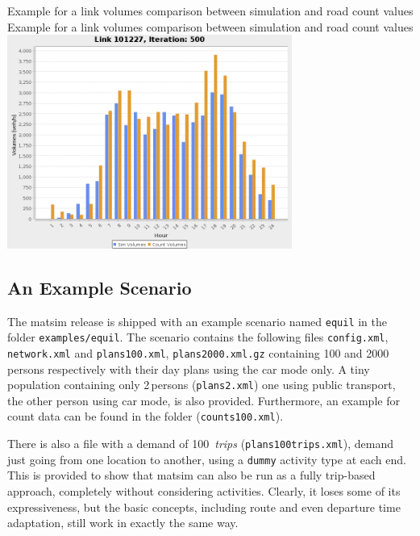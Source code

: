 \createfigure%
{Example for a link volumes comparison between simulation and road count values}%
{Example for a link volumes comparison between simulation and road count values}%
{\label{fig:countcomparison}}%
{\includegraphics[width=0.7\textwidth, angle=0]{using/figures/link101227.png}}%
{}

\subsection{An Example Scenario}
The \gls{matsim} release is shipped with an example scenario named \lstinline|equil| in the folder \lstinline|examples/equil|. The scenario contains the following files \lstinline|config.xml|, \lstinline|network.xml| and \lstinline|plans100.xml|, \lstinline|plans2000.xml.gz| containing 100 and 2000\,persons respectively with their day plans using the car mode only. A tiny population containing only 2\,persons (\lstinline|plans2.xml|) one using public transport, the other person using car mode, is also provided. Furthermore, an example for count data can be found in the folder (\lstinline|counts100.xml|). 



There is also a file with a demand of 
100~\emph{trips} (\lstinline|plans100trips.xml|), \ie demand just going from one location to another, using a \lstinline$dummy$ activity type at each end.  This is provided to show that \gls{matsim} can also be run as a fully trip-based approach, \ie completely without considering activities. Clearly, it loses some of its expressiveness, but the basic concepts, including route and even departure time adaptation, still work in exactly the same way.

